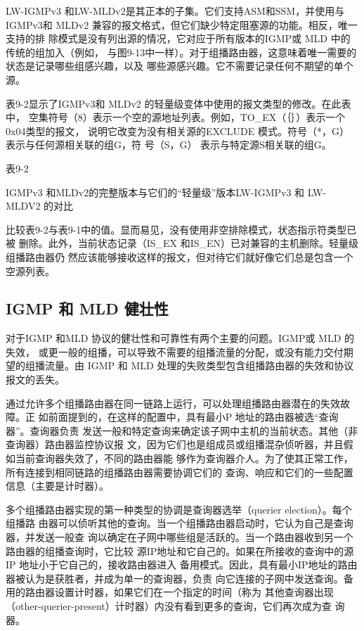 LW-IGMPv3 和LW-MLDv2是其正本的子集。它们支持ASM和SSM，并使用与
IGMPv3和 MLDv2 兼容的报文格式，但它们缺少特定阻塞源的功能。相反，唯一支持的排
除模式是没有列出源的情况，它对应于所有版本的IGMP或 MLD 中的传统的组加入（例如，
与图9-13中一样）。对于组播路由器，这意味着唯一需要的状态是记录哪些组感兴趣，以及
哪些源感兴趣。它不需要记录任何不期望的单个源。

表9-2显示了IGMPv3和 MLDv2 的轻量级变体中使用的报文类型的修改。在此表中，
空集符号（8）表示一个空的源地址列表。例如，TO\_EX（｛｝）表示一个0x04类型的报文，
说明它改变为没有相关源的EXCLUDE 模式。符号（*，G） 表示与任何源相关联的组G，符
号（S，G） 表示与特定源S相关联的组G。

表9-2

IGMPv3 和MLDv2的完整版本与它们的“轻量级”版本LW-IGMPv3 和 LW-MLDV2 的对比

比较表9-2与表9-1中的值。显而易见，没有使用非空排除模式，状态指示符类型已被
删除。此外，当前状态记录（IS\_EX 和IS\_EN）已对兼容的主机删除。轻量级组播路由器仍
然应该能够接收这样的报文，但对待它们就好像它们总是包含一个空源列表。

\subsection{IGMP 和 MLD 健壮性}
对于IGMP 和MLD 协议的健壮性和可靠性有两个主要的问题。IGMP或 MLD 的失效，
或更一般的组播，可以导致不需要的组播流量的分配，或没有能力交付期望的组播流量。由
IGMP 和 MLD 处理的失败类型包含组播路由器的失效和协议报文的丢失。

通过允许多个组播路由器在同一链路上运行，可以处理组播路由器潜在的失效故障。正
如前面提到的，在这样的配置中，具有最小P 地址的路由器被选“查询器”。查询器负责
发送一般和特定查询来确定该子网中主机的当前状态。其他（非查询器）路由器监控协议报
文，因为它们也是组成员或组播混杂侦听器，并且假如当前查询器失效了，不同的路由器能
够作为查询器介人。为了使其正常工作，所有连接到相同链路的组播路由器需要协调它们的
查询、响应和它们的一些配置信息（主要是计时器）。

多个组播路由器实现的第一种类型的协调是查询器选举（querier election）。每个组播路
由器可以侦听其他的查询。当一个组播路由器启动时，它认为自己是查询器，并发送一般查
询以确定在子网中哪些组是活跃的。当一个路由器收到另一个路由器的组播查询时，它比较
源IP地址和它自己的。如果在所接收的查询中的源IP 地址小于它自己的，接收路由器进入
备用模式。因此，具有最小IP地址的路由器被认为是获胜者，并成为单一的查询器，负责
向它连接的子网中发送查询。备用的路由器设置计时器，如果它们在一个指定的时间（称为
其他查询器出现（other-querier-present）计时器）内没有看到更多的查询，它们再次成为查
询器。

